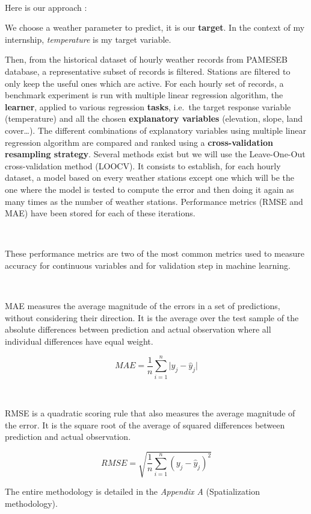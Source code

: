 \documentclass[12pt,twoside]{reedthesis}
\theoremstyle{definition}
\theoremstyle{definition}
\theoremstyle{definition}
\theoremstyle{remark}
\begin{document}
~

Here is our approach :

We choose a weather parameter to predict, it is our \textbf{target}. In
the context of my internship, \emph{temperature} is my target variable.

Then, from the historical dataset of hourly weather records from PAMESEB
database, a representative subset of records is filtered. Stations are
filtered to only keep the useful ones which are active. For each hourly
set of records, a benchmark experiment is run with multiple linear
regression algorithm, the \textbf{learner}, applied to various
regression \textbf{tasks}, i.e.~the target response variable
(temperature) and all the chosen \textbf{explanatory variables}
(elevation, slope, land cover\ldots{}). The different combinations of
explanatory variables using multiple linear regression algorithm are
compared and ranked using a \textbf{cross-validation resampling
strategy}. Several methods exist but we will use the Leave-One-Out
cross-validation method (LOOCV). It consists to establish, for each
hourly dataset, a model based on every weather stations except one which
will be the one where the model is tested to compute the error and then
doing it again as many times as the number of weather stations.
Performance metrics (RMSE and MAE) have been stored for each of these
iterations.

~

These performance metrics are two of the most common metrics used to
measure accuracy for continuous variables and for validation step in
machine learning.

~

MAE measures the average magnitude of the errors in a set of
predictions, without considering their direction. It is the average over
the test sample of the absolute differences between prediction and
actual observation where all individual differences have equal weight.

\[
MAE = \frac{1}{n} \sum_{i=1}^{n}{ \lvert y_{j} - \widehat{y}_{j} \rvert}
\]

~ ~

RMSE is a quadratic scoring rule that also measures the average
magnitude of the error. It is the square root of the average of squared
differences between prediction and actual observation.

\[
RMSE = \sqrt{\frac{1}{n} \sum_{i=1}^{n}{( y_{j} - \widehat{y}_{j} )^2}}
\]

The entire methodology is detailed in the \emph{Appendix A}
(Spatialization methodology).
\end{document}
